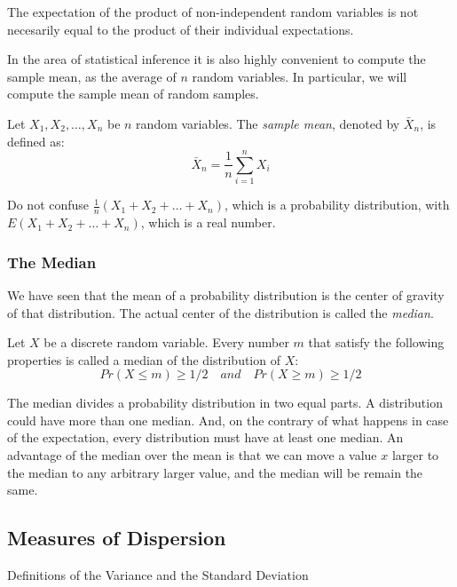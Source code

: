 The expectation of the product of non-independent random variables is not necesarily equal to the product of their individual expectations.

In the area of statistical inference it is also highly convenient to compute the sample mean, as the average of $n$ random variables. In particular, we will compute the sample mean of random samples.

\begin{definition}
Let $X_1, X_2, \ldots, X_n$ be $n$ random variables. The \emph{sample mean}, denoted by $\bar{X}_n$, is defined as:
\[
\bar{X}_n = \frac{1}{n} \sum_{i=1}^n X_i
\]
\end{definition}

Do not confuse $\frac{1}{n} \left( X_1 + X_2 + \ldots + X_n \right)$, which is a probability distribution, with $E \left( X_1 + X_2 + \ldots + X_n \right)$, which is a real number.


\subsubsection*{The Median}


We have seen that the mean of a probability distribution is the center of gravity of that distribution. The actual center of the distribution is called  the \emph{median}.

\begin{definition}
Let $X$ be a discrete random variable. Every number $m$ that satisfy the following properties is called a median of the distribution of $X$:
\[
Pr\left(X\leq m\right)\geq1/2 \quad and \quad Pr\left(X\geq m\right) \geq 1/2
\]
\end{definition}

The median divides a probability distribution in two equal parts. A distribution could have more than one median. And, on the contrary of what happens in case of the expectation, every distribution must have at least one median. An advantage of the median over the mean is that we can move a value $x$ larger to the median to any arbitrary larger value, and the median will be remain the same. 

\subsection{Measures of Dispersion}

Definitions of the Variance and the Standard Deviation

